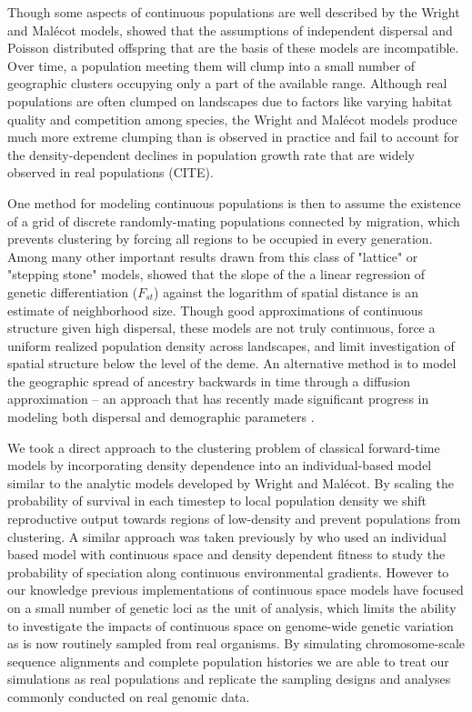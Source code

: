 \documentclass[11pt,twoside,lineno]{preprint}
\begin{document}
Though some aspects of continuous populations are well described by the Wright and Malécot models, \cite{Felsenstein1975} showed that the assumptions of independent dispersal and Poisson distributed offspring that are the basis of these models are incompatible. Over time, a population meeting them will clump into a small number of geographic clusters occupying only a part of the available range. Although real populations are often clumped on landscapes due to factors like varying habitat quality and competition among species, the Wright and Malécot models produce much more extreme clumping than is observed in practice and fail to account for the density-dependent declines in population growth rate that are widely observed in real populations (CITE). 

One method for modeling continuous populations is then to assume the existence of a grid of discrete randomly-mating populations connected by migration, which prevents clustering by forcing all regions to be occupied in every generation. Among many other important results drawn from this class of "lattice" or "stepping stone" models, \cite{Rousset1997} showed that the slope of the a linear regression of genetic differentiation ($F_{st}$) against the logarithm of spatial distance is an estimate of neighborhood size. Though good approximations of continuous structure given high dispersal, these models are not truly continuous, force a uniform realized population density across landscapes, and limit investigation of spatial structure below the level of the deme. An alternative method is to model the geographic spread of ancestry backwards in time through a diffusion approximation -- an approach that has recently made significant progress in modeling both dispersal and demographic parameters \citep{Barton2010,Kelleher2014,Ringbauer2017,Ringbauer2018}.

We took a direct approach to the clustering problem of classical forward-time models by incorporating density dependence into an individual-based model similar to the analytic models developed by Wright and Malécot. By scaling the probability of survival in each timestep to local population density we shift reproductive output towards regions of low-density and prevent populations from clustering. A similar approach was taken previously by \citep{Doebeli2003} who used an individual based model with continuous space and density dependent fitness to study the probability of speciation along continuous environmental gradients. However to our knowledge previous implementations of continuous space models have focused on a small number of genetic loci as the unit of analysis, which limits the ability to investigate the impacts of continuous space on genome-wide genetic variation as is now routinely sampled from real organisms. By simulating chromosome-scale sequence alignments and complete population histories we are able to treat our simulations as real populations and replicate the sampling designs and analyses commonly conducted on real genomic data.
\end{document}

